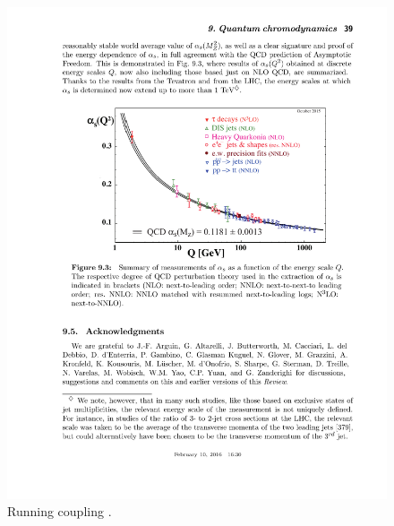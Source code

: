 \documentclass[11pt, a4paper, twoside]{book}
\begin{document}
\begin{figure}[t]
	\centering
	\includegraphics[width=\textwidth]{QCDRunningCoupling}
	\caption{Running coupling \cite{PhysRevD.98.030001}.}\label{fig:RunningCoupling}
\end{figure}
\end{document}
